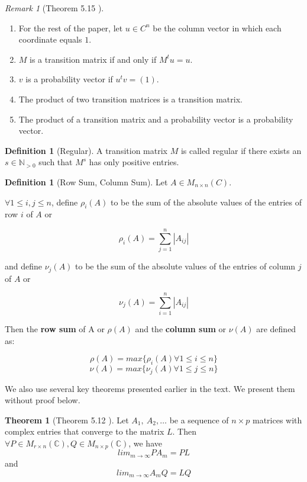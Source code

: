 \documentclass{amsart}
\theoremstyle{definition}
\newtheorem{definition}[thm]{Definition}
\newtheorem{theorem}{Theorem}
\theoremstyle{remark}
\newtheorem{remark}[thm]{Remark}
\numberwithin{equation}{section}
\begin{document}
\begin{remark}[Theorem 5.15 \cite{friedberg2003linear}]\label{theorem515}
\begin{enumerate}
	\item For the rest of the paper, let $u \in C^n$ be the column vector in which each coordinate equals $1$.
	\item $M$ is a transition matrix if and only if $M^tu = u$.
	\item $v$ is a probability vector if $u^tv = (1)$.
	\item The product of two transition matrices is a transition matrix.
	\item The product of a transition matrix and a probability vector is a probability vector.
\end{enumerate}

\end{remark}




\begin{definition}[Regular]
A transition matrix $M$ is called regular if there exists an $s \in \mathbb{N}_{>0}$ such that $M^s$ has only positive entries.

\end{definition}

\begin{definition}[Row Sum, Column Sum]
Let $A \in M_{n \times n }(C)$.

$\forall 1 \leq i, j \leq n$, define $\rho_i(A)$ to be the sum of the absolute values of the entries of row $i$ of $A$ or 

$$ \rho_i(A) = \sum_{j=1}^n|A_{ij}| $$

and define $\nu_j(A)$ to be the sum of the absolute values of the entries of column $j$ of $A$ or 

$$ \nu_j(A) = \sum_{i=1}^n|A_{ij}| $$

Then the \textbf{row sum} of A or $\rho(A)$ and the \textbf{column sum} or $\nu(A)$ are defined as:

$$ \rho(A) = max\{\rho_i(A) \forall 1 \leq i \leq n \} $$
$$ \nu(A) = max\{\nu_j(A) \forall 1 \leq j \leq n \} $$

\end{definition}



We also use several key theorems presented earlier in the text.
We present them without proof below.

\begin{theorem}[Theorem 5.12 \cite{friedberg2003linear}]\label{theorem512}
Let $A_1,\ A_2, \ldots$ be a sequence of $n \times p$ matrices with complex entries that converge to the matrix $L$.
Then $\forall P \in M_{r \times n}(\mathbb{C}), Q \in M_{n \times p}(\mathbb{C})$, we have 
$$lim_{m \to \infty} PA_m = PL$$
and 
$$ lim_{m \to \infty} A_mQ = LQ $$

\end{theorem}
\end{document}
